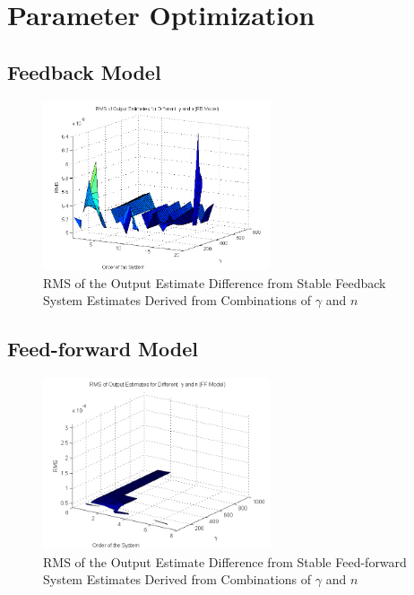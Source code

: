 \chapter{Parameter Optimization}\label{sec:RMS}

\section{Feedback Model}
\begin{figure}[h]
\centering
\includegraphics[width=0.6\textwidth]{pics/RMS_FB}
\caption{RMS of the Output Estimate Difference from Stable Feedback System Estimates Derived from Combinations of $\gamma$ and $n$}
\label{fig:RMS_FB}
\end{figure}

\section{Feed-forward Model}
\begin{figure}[h]
\centering
\includegraphics[width=0.6\textwidth]{pics/RMS_FF}
\caption{RMS of the Output Estimate Difference from Stable Feed-forward System Estimates Derived from Combinations of $\gamma$ and $n$}
\label{fig:RMS_FB}
\end{figure}












